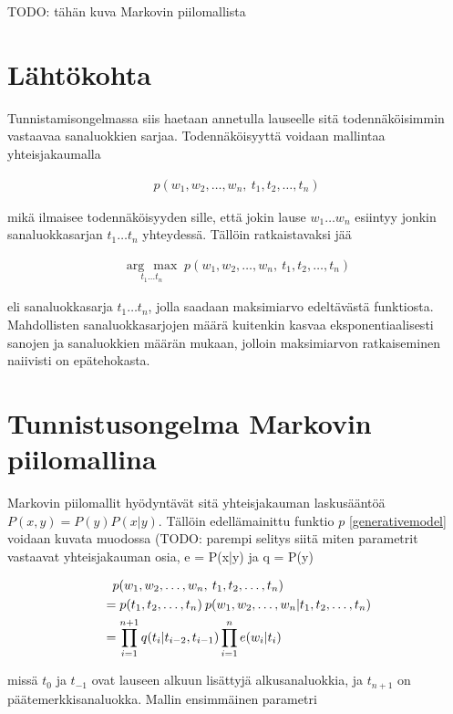 \documentclass[utf8,bachelor,manualbib]{gradu3}
\newcommand{\argmax}[1]{\underset{#1}{\operatorname{arg}\,\operatorname{max}}\;}
\begin{document}
TODO: tähän kuva Markovin piilomallista


\section{Lähtökohta}

Tunnistamisongelmassa siis haetaan annetulla lauseelle sitä todennäköisimmin vastaavaa sanaluokkien sarjaa. Todennäköisyyttä voidaan mallintaa yhteisjakaumalla

\begin{align}
p(w_1, w_2, \ldots, w_n,\: t_1, t_2, \ldots, t_n)
\label{generativemodel}
\end{align}

mikä ilmaisee todennäköisyyden sille, että jokin lause $ w_1 \ldots w_n $ esiintyy jonkin sanaluokkasarjan $ t_1 \ldots t_n $ yhteydessä. Tällöin ratkaistavaksi jää

\begin{align}
\argmax{t_1 \ldots t_n} p(w_1, w_2, \ldots, w_n,\: t_1, t_2, \ldots, t_n)
\end{align}

eli sanaluokkasarja $ t_1 \ldots t_n $, jolla saadaan maksimiarvo edeltävästä funktiosta. Mahdollisten sanaluokkasarjojen määrä kuitenkin kasvaa eksponentiaalisesti sanojen ja sanaluokkien määrän mukaan, jolloin maksimiarvon ratkaiseminen naiivisti on epätehokasta.


\section{Tunnistusongelma Markovin piilomallina}

Markovin piilomallit hyödyntävät sitä yhteisjakauman laskusääntöä $P(x,y) = P(y)P(x|y)$. Tällöin edellämainittu funktio $ p $ \eqref{generativemodel} voidaan kuvata muodossa (TODO: parempi selitys siitä miten parametrit vastaavat yhteisjakauman osia, e = P(x|y) ja q = P(y)


\begin{align}
& \hphantom{= } p(w_1, w_2, \ldots, w_n,\: t_1, t_2, \ldots, t_n) \\
& = p(t_1, t_2, \ldots, t_n)\:p(w_1, w_2, \ldots, w_n|t_1, t_2, \ldots, t_n) \\
& = \prod_{i=1}^{n+1} q(t_i | t_{i-2}, t_{i-1}) \prod_{i=1}^{n}e(w_i | t_i)
\end{align}

missä $t_0$ ja $t_{-1}$ ovat lauseen alkuun lisättyjä alkusanaluokkia, ja $t_{n+1}$ on päätemerkkisanaluokka. Mallin ensimmäinen parametri
\end{document}
